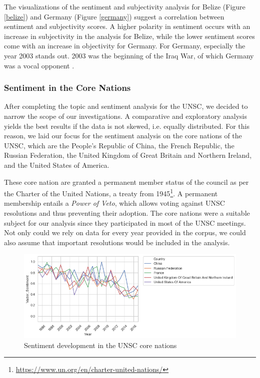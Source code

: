 The visualizations of the sentiment and subjectivity analysis for Belize (Figure \ref{belize}) and Germany (Figure \ref{germany}) suggest a correlation between sentiment and subjectivity scores. A higher polarity in sentiment occurs with an increase in subjectivity in the analysis for Belize, while the lower sentiment scores come with an increase in objectivity for Germany. For Germany, especially the year 2003 stands out. 2003 was the beginning of the Iraq War, of which Germany was a vocal opponent \citep{germiraq}.

\subsubsection{Sentiment in the Core Nations}
After completing the topic and sentiment analysis for the UNSC, we decided to narrow the scope of our investigations. A comparative and exploratory analysis yields the best results if the data is not skewed, i.e. equally distributed. For this reason, we laid our focus for the sentiment analysis on the core nations of the UNSC, which are the People's Republic of China, the French Republic, the Russian Federation, the United Kingdom of Great Britain and Northern Ireland, and the United States of America.

These core nation are granted a permanent member status of the council as per the Charter of the United Nations, a treaty from 1945\footnote{\href{https://www.un.org/en/charter-united-nations/}{https://www.un.org/en/charter-united-nations/}}. A permanent membership entails a \textit{Power of Veto}, which allows voting against UNSC resolutions and thus preventing their adoption. 
The core nations were a suitable subject for our analysis since they participated in most of the UNSC meetings. Not only could we rely on data for every year provided in the corpus, we could also assume that important resolutions would be included in the analysis.

\begin{figure}[t]
  \centering
  \includegraphics[width=14cm]{img/over_time_Vader_Sentiment.png}
  \caption{Sentiment development in the UNSC core nations}
  \label{fig:vadercore}
\end{figure}%

